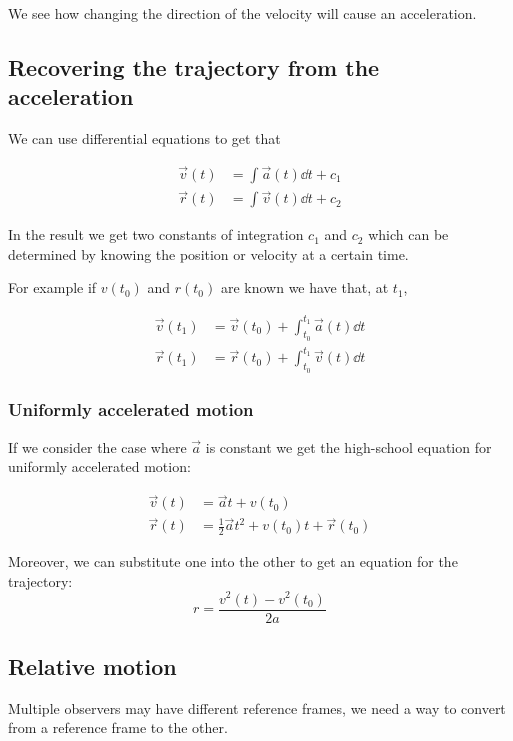 \documentclass[10pt]{extarticle}
\begin{document}
We see how changing the direction of the velocity will cause an acceleration.

\subsection{Recovering the trajectory from the acceleration}

We can use differential equations to get that

\begin{align*}
    \vec{v}(t) & = \int \vec{a}(t) \dd{t} + c_1 \\
    \vec{r}(t) & = \int \vec{v}(t) \dd{t} + c_2
\end{align*}

In the result we get two constants of integration $c_1$ and $c_2$
which can be determined by knowing the position or velocity at a certain time.

For example if $v(t_0)$ and $r(t_0)$ are known we have that, at $t_1$,

\begin{align*}
    \vec{v}(t_1) & = \vec{v}(t_0) + \int_{t_0}^{t_1} \vec{a}(t) \dd{t} \\
    \vec{r}(t_1) & = \vec{r}(t_0) + \int_{t_0}^{t_1} \vec{v}(t) \dd{t}
\end{align*}

\subsubsection{Uniformly accelerated motion}

If we consider the case where $\vec{a}$ is constant we get
the high-school equation for uniformly accelerated motion:

\begin{align*}
    \vec{v}(t) & = \vec{a} t + v(t_0)                                \\
    \vec{r}(t) & = \frac{1}{2} \vec{a} t^2 + v(t_0) t + \vec{r}(t_0)
\end{align*}

Moreover, we can substitute one into the other to get an equation for the trajectory:
$$
    r = \frac{v^2(t) - v^2(t_0)}{2a}
$$

\subsection{Relative motion}

Multiple observers may have different reference frames,
we need a way to convert from a reference frame to the other.
\end{document}
